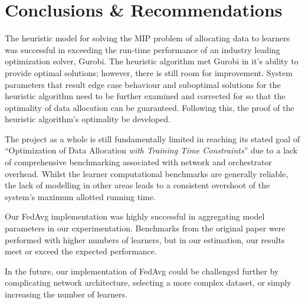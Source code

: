 \documentclass[../mthe-493-final-project.tex]{subfiles}
\begin{document}
    \chapter{Conclusions \& Recommendations}
    \label{ch:conclusions-and-recommendations}
    
    The heuristic model for solving the MIP problem of allocating data to learners was successful in exceeding the run-time performance of an industry leading optimization solver, Gurobi. The heuristic algorithm met Gurobi in it's ability to provide optimal solutions; however, there is still room for improvement. System parameters that result edge case behaviour and suboptimal solutions for the heuristic algorithm need to be further examined and corrected for so that the optimality of data allocation can be guaranteed. Following this, the proof of the heuristic algorithm's optimality be developed.
    
    The project as a whole is still fundamentally limited in reaching its stated goal of ``Optimization of Data Allocation \textit{with Training Time Constraints}'' due to a lack of comprehensive benchmarking associated with network and orchestrator overhead. Whilst the learner computational benchmarks are generally reliable, the lack of modelling in other areas leads to a consistent overshoot of the system's maximum allotted running time.
    
    Our FedAvg implementation was highly successful in aggregating model parameters in our experimentation. Benchmarks from the original paper were performed with higher numbers of learners, but in our estimation, our results meet or exceed the expected performance.
    
    In the future, our implementation of FedAvg could be challenged further by complicating network architecture, selecting a more complex dataset, or simply increasing the number of learners.
\end{document}
